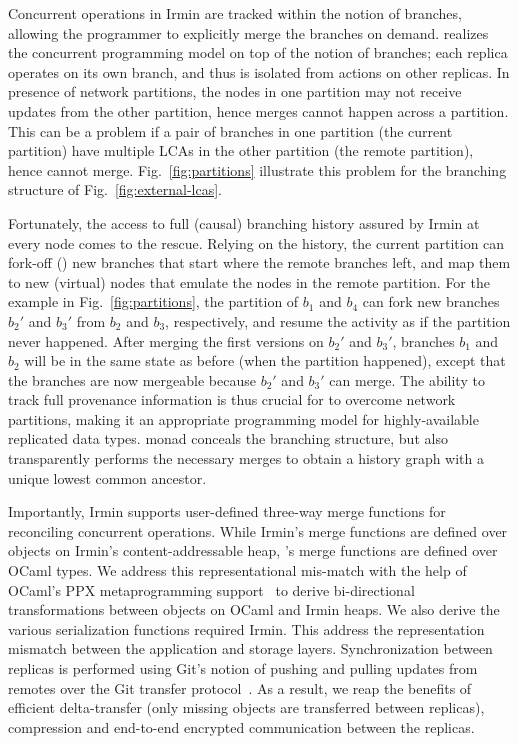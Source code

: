 Concurrent operations in Irmin are tracked within the notion of branches,
allowing the programmer to explicitly merge the branches on demand. \name
realizes the concurrent programming model on top of the notion of branches;
each replica operates on its own branch, and thus is isolated from actions on
other replicas. In presence of network partitions, the nodes in one partition
may not receive updates from the other partition, hence merges cannot happen
across a partition. This can be a problem if a pair of branches in one
partition (the current partition) have multiple LCAs in the other partition
(the remote partition), hence cannot merge. Fig.~\ref{fig:partitions}
illustrate this problem for the branching structure of
Fig.~\ref{fig:external-lcas}.

Fortunately, the access to full (causal) branching history assured by Irmin at
every node comes to the rescue. Relying on the history, the current partition
can fork-off () new branches that start where the remote branches left,
and map them to new (virtual) nodes that emulate the nodes in the remote
partition. For the example in Fig.~\ref{fig:partitions}, the partition of $b_1$
and $b_4$ can fork new branches $b_2'$ and $b_3'$ from $b_2$ and $b_3$,
respectively, and resume the activity as if the partition never happened. After
merging the first versions on $b_2'$ and $b_3'$, branches $b_1$ and $b_2$ will
be in the same state as before (when the partition happened), except that the
branches are now mergeable because $b_2'$ and $b_3'$ can merge. The ability to
track full provenance information is thus crucial for \name to overcome network
partitions, making it an appropriate programming model for highly-available
replicated data types. \name monad conceals the branching structure, but also
transparently performs the necessary merges to obtain a history graph with a
unique lowest common ancestor.

Importantly, Irmin supports user-defined three-way merge functions for
reconciling concurrent operations. While Irmin's merge functions are defined
over objects on Irmin's content-addressable heap, \name's merge functions are
defined over OCaml types. We address this representational mis-match with the
help of OCaml's PPX metaprogramming support~\cite{ppx} to derive bi-directional
transformations between objects on OCaml and Irmin heaps. We also derive the
various serialization functions required Irmin. This address the representation
mismatch between the application and storage layers. Synchronization between
replicas is performed using Git's notion of pushing and pulling updates from
remotes over the Git transfer protocol~\cite{git-tp}. As a result, we reap the
benefits of efficient delta-transfer (only missing objects are transferred
between replicas), compression and end-to-end encrypted communication between
the replicas.
